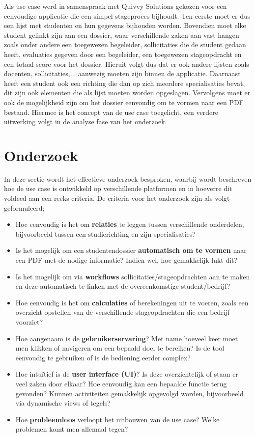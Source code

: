 Als use case werd in samenspraak met Quivvy Solutions gekozen voor een eenvoudige applicatie die een simpel stageproces bijhoudt. Ten eerste moet er dus een lijst met studenten en hun gegevens bijhouden worden. Bovendien moet elke student gelinkt zijn aan een dossier, waar verschillende zaken aan vast hangen zoals onder andere een toegewezen begeleider, sollicitaties die de student gedaan heeft, evaluaties gegeven door een begeleider, een toegewezen stageopdracht en een totaal score voor het dossier. Hieruit volgt dus dat er ook andere lijsten zoals docenten, sollicitaties,$\ldots$ aanwezig moeten zijn binnen de applicatie. Daarnaast heeft een student ook een richting die dan op zich meerdere specialisaties bevat, dit zijn ook elementen die als lijst moeten worden opgeslagen. Vervolgens moet er ook de mogelijkheid zijn om het dossier eenvoudig om te vormen naar een PDF bestand. Hiermee is het concept van de use case toegelicht, een verdere uitwerking volgt in de analyse fase van het onderzoek. \\

\newpage

\section{Onderzoek} 
In deze sectie wordt het effectieve onderzoek besproken, waarbij wordt beschreven hoe de use case is ontwikkeld op verschillende platformen en in hoeverre dit voldeed aan een reeks criteria. De criteria voor het onderzoek zijn als volgt geformuleerd;

\begin{itemize}
    \item Hoe eenvoudig is het om \textbf{relaties} te leggen tussen verschillende onderdelen, bijvoorbeeld tussen een studierichting en zijn specialisaties?
    \item Is het mogelijk om een studentendossier \textbf{automatisch om te vormen} naar een PDF met de nodige informatie? Indien wel, hoe gemakkelijk lukt dit?
    \item Is het mogelijk om via \textbf{workflows} sollicitaties/stageopdrachten aan te maken en deze automatisch te linken met de overeenkomstige student/bedrijf?
    \item Hoe eenvoudig is het om \textbf{calculaties} of berekeningen uit te voeren, zoals een overzicht opstellen van de verschillende stageopdrachten die een bedrijf voorziet?
    \item Hoe aangenaam is de \textbf{gebruikerservaring}? Met name hoeveel keer moet men klikken of navigeren om een bepaald doel te bereiken? Is de tool eenvoudig te gebruiken of is de bediening eerder complex?
    \item Hoe intuïtief is de \textbf{user interface (UI)}? Is deze overzichtelijk of staan er veel zaken door elkaar? Hoe eenvoudig kan een bepaalde functie terug gevonden? Kunnen activiteiten gemakkelijk opgevolgd worden, bijvoorbeeld via dynamische views of tegels?
    \item Hoe \textbf{probleemloos} verloopt het uitbouwen van de use case? Welke problemen komt men allemaal tegen?
\end{itemize}

